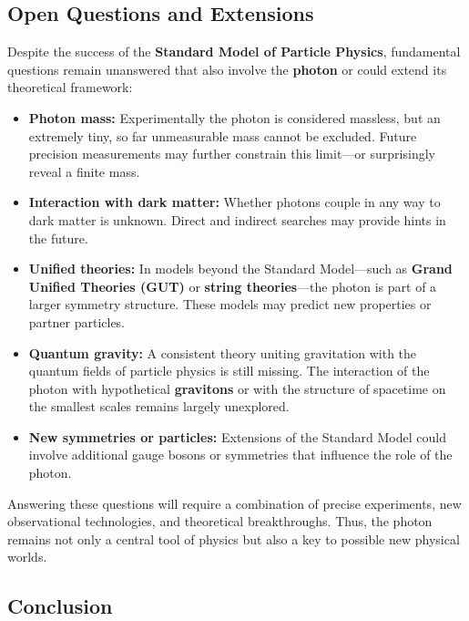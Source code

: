 \subsection{Open Questions and Extensions}

Despite the success of the \textbf{Standard Model of Particle Physics}, fundamental questions remain unanswered that also involve the \textbf{photon} or could extend its theoretical framework:

\begin{itemize}
	\item \textbf{Photon mass:}  
	Experimentally the photon is considered massless, but an extremely tiny, so far unmeasurable mass cannot be excluded.  
	Future precision measurements may further constrain this limit—or surprisingly reveal a finite mass.
	
	\item \textbf{Interaction with dark matter:}  
	Whether photons couple in any way to dark matter is unknown.  
	Direct and indirect searches may provide hints in the future.
	
	\item \textbf{Unified theories:}  
	In models beyond the Standard Model—such as \textbf{Grand Unified Theories (GUT)} or \textbf{string theories}—the photon is part of a larger symmetry structure.  
	These models may predict new properties or partner particles.
	
	\item \textbf{Quantum gravity:}  
	A consistent theory uniting gravitation with the quantum fields of particle physics is still missing.  
	The interaction of the photon with hypothetical \textbf{gravitons} or with the structure of spacetime on the smallest scales remains largely unexplored.
	
	\item \textbf{New symmetries or particles:}  
	Extensions of the Standard Model could involve additional gauge bosons or symmetries that influence the role of the photon.
\end{itemize}

Answering these questions will require a combination of precise experiments, new observational technologies, and theoretical breakthroughs.  
Thus, the photon remains not only a central tool of physics but also a key to possible new physical worlds.

\subsection{Conclusion}
